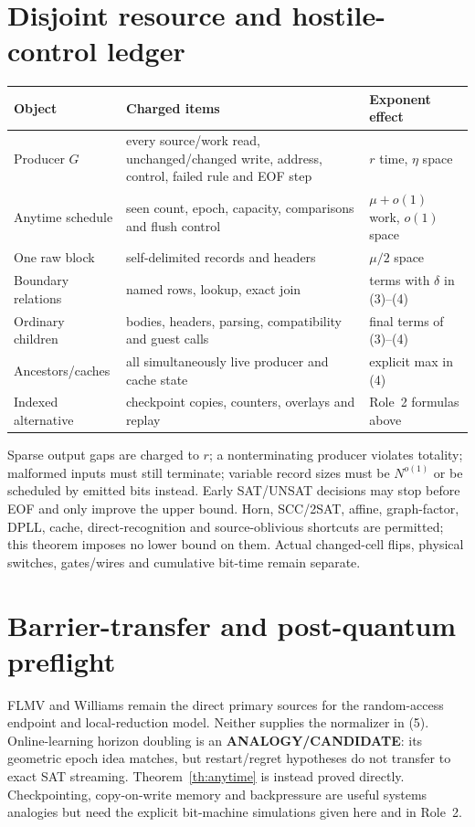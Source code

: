 \documentclass[11pt]{article}
\begin{document}
\section{Disjoint resource and hostile-control ledger}
\begin{center}
\begin{tabularx}{.98\linewidth}{p{.22\linewidth}X p{.19\linewidth}}
\toprule
Object & Charged items & Exponent effect\\
\midrule
Producer $G$ & every source/work read, unchanged/changed write, address,
control, failed rule and EOF step & $r$ time, $\eta$ space\\
Anytime schedule & seen count, epoch, capacity, comparisons and flush control &
$\mu+o(1)$ work, $o(1)$ space\\
One raw block & self-delimited records and headers & $\mu/2$ space\\
Boundary relations & named rows, lookup, exact join & terms with $\delta$ in (3)--(4)\\
Ordinary children & bodies, headers, parsing, compatibility and guest calls & final terms of (3)--(4)\\
Ancestors/caches & all simultaneously live producer and cache state & explicit max in (4)\\
Indexed alternative & checkpoint copies, counters, overlays and replay & Role~2 formulas above\\
\bottomrule
\end{tabularx}
\end{center}
Sparse output gaps are charged to $r$; a nonterminating producer violates
totality; malformed inputs must still terminate; variable record sizes must be
$N^{o(1)}$ or be scheduled by emitted bits instead.  Early SAT/UNSAT decisions
may stop before EOF and only improve the upper bound.  Horn, SCC/2SAT, affine,
graph-factor, DPLL, cache, direct-recognition and source-oblivious shortcuts are
permitted; this theorem imposes no lower bound on them.  Actual changed-cell
flips, physical switches, gates/wires and cumulative bit-time remain separate.

\section{Barrier-transfer and post-quantum preflight}
FLMV and Williams remain the direct primary sources for the random-access
endpoint and local-reduction model.  Neither supplies the normalizer in (5).
Online-learning horizon doubling is an \textbf{ANALOGY/CANDIDATE}: its geometric
epoch idea matches, but restart/regret hypotheses do not transfer to exact SAT
streaming.  Theorem~\ref{th:anytime} is instead proved directly.  Checkpointing,
copy-on-write memory and backpressure are useful systems analogies but need the
explicit bit-machine simulations given here and in Role~2.
\end{document}
